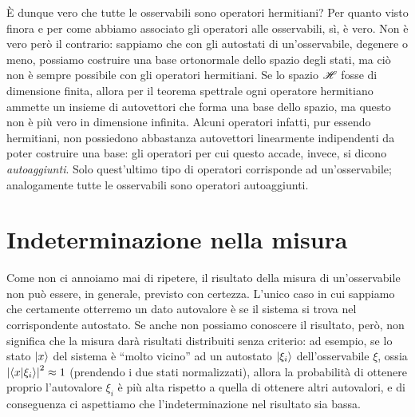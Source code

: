 È dunque vero che tutte le osservabili sono operatori hermitiani?
Per quanto visto finora e per come abbiamo associato gli operatori alle osservabili, s\`i, è vero.
Non è vero però il contrario: sappiamo che con gli autostati di un'osservabile, degenere o meno, possiamo costruire una base ortonormale dello spazio degli stati, ma ciò non è sempre possibile con gli operatori hermitiani.
Se lo spazio $\mathscr H$ fosse di dimensione finita, allora per il teorema spettrale ogni operatore hermitiano ammette un insieme di autovettori che forma una base dello spazio, ma questo non è più vero in dimensione infinita.
Alcuni operatori infatti, pur essendo hermitiani, non possiedono abbastanza autovettori linearmente indipendenti da poter costruire una base: gli operatori per cui questo accade, invece, si dicono \emph{autoaggiunti}.
Solo quest'ultimo tipo di operatori corrisponde ad un'osservabile; analogamente tutte le osservabili sono operatori autoaggiunti.

\section{Indeterminazione nella misura}
Come non ci annoiamo mai di ripetere, il risultato della misura di un'osservabile non può essere, in generale, previsto con certezza.
L'unico caso in cui sappiamo che certamente otterremo un dato autovalore è se il sistema si trova nel corrispondente autostato.
Se anche non possiamo conoscere il risultato, però, non significa che la misura darà risultati distribuiti senza criterio: ad esempio, se lo stato $\left|{x}\right\rangle$ del sistema è ``molto vicino'' ad un autostato $\left|{\xi_i}\right\rangle$ dell'osservabile $\xi$, ossia $\left|{\left\langle{x}\middle|{\xi_i}\right\rangle}\right|^2\approx 1$ (prendendo i due stati normalizzati), allora la probabilità di ottenere proprio l'autovalore $\xi_i$ è più alta rispetto a quella di ottenere altri autovalori, e di conseguenza ci aspettiamo che l'indeterminazione nel risultato sia bassa.

